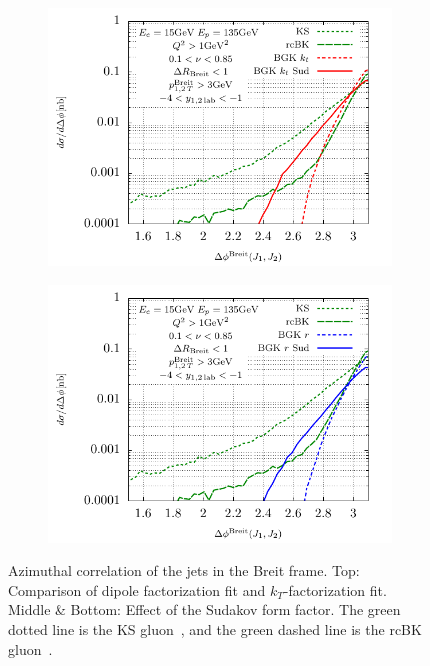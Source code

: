 \documentclass[11pt]{article}
\begin{document}
\begin{figure}[p]
	\begin{subfigure}{0.5\textwidth}
		\includegraphics[width=\textwidth]{plots/plotBGK2Jets}
	\end{subfigure}
	\begin{subfigure}{0.5\textwidth}
		\includegraphics[width=\textwidth]{plots/plotBGK3Jets}
	\end{subfigure}
\caption{Azimuthal correlation of the jets in the Breit frame. Top: Comparison of dipole factorization fit and $k_T$-factorization fit. Middle \& Bottom: Effect of the Sudakov form factor. The green dotted line is the KS gluon~\cite{vanHameren:2021sqc}, and the green dashed line is the rcBK gluon~\cite{Hentschinski:2022rsa}. }
\label{fig:jj-breit}
\end{figure}
\end{document}
